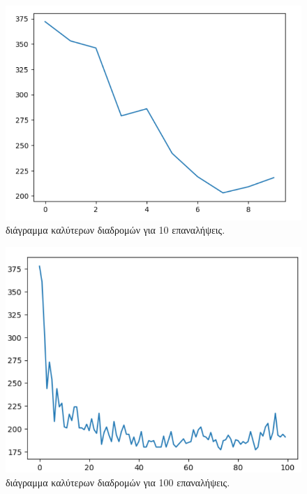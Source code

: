 \begin{figure}
    \centering
    \includegraphics[scale=0.50]{2947_thesis/pictures/i10.png}
    \caption{διάγραμμα καλύτερων διαδρομών για 10 επαναλήψεις.}
    \label{i10}
\end{figure}
\begin{figure}
    \centering
    \includegraphics[scale=0.50]{2947_thesis/pictures/i100.png}
    \caption{διάγραμμα καλύτερων διαδρομών για 100 επαναλήψεις.}
    \label{i100}
\end{figure}

